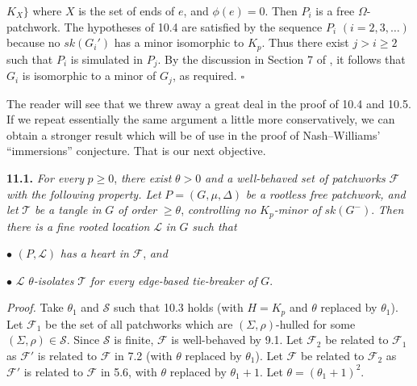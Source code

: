 \noindent $K_X\}$ where $X$ is the set of ends of $e$, and $\phi(e) = 0$. Then $P_i$ is a free $\Omega$-patchwork. The hypotheses of 10.4 are satisfied by the sequence $P_i$ $(i = 2, 3, \dots)$ because no $sk(G_i')$ has a minor isomorphic to $K_p$. Thus there exist $j > i \ge 2$ such that $P_i$ is simulated in $P_j$. By the discussion in Section 7 of \del{[2]}\fix{[1]}, it follows that $G_i$ is isomorphic to a minor of $G_j$, as required. $\square$


The reader will see that we threw away a great deal in the proof of 10.4 and 10.5. If we repeat essentially the same argument a little more conservatively, we can obtain a stronger result which will be of use in the proof of Nash--Williams' ``immersions'' conjecture. That is our next objective.

\textbf{11.1.} \textit{For every} $p \ge 0$, \textit{there exist} $\theta > 0$ \textit{and a well-behaved set of patchworks} $\mathcal{F}$ \textit{with the following property. Let} $P = (G, \mu, \Delta)$ \textit{be a rootless free patchwork, and let} $\mathcal{T}$ \textit{be a tangle in} $G$ \textit{of order} $\ge \theta$, \textit{controlling no} $K_p$\textit{-minor of} $sk(G^-)$. \textit{Then there is a fine rooted location} $\mathcal{L}$ \textit{in} $G$ \textit{such that}

\hspace*{12pt}$\bullet$ $(P, \mathcal{L})$ \textit{has a heart in} $\mathcal{F}$, \textit{and}

\hspace*{12pt}$\bullet$ $\mathcal{L}$ $\theta$\textit{-isolates} $\mathcal{T}$ \textit{for every edge-based tie-breaker of} $G$.

\textit{Proof.} Take $\theta_1$ and $\mathcal{S}$ such that 10.3 holds (with $H = K_p$ and $\theta$ replaced by $\theta_1$). Let $\mathcal{F}_1$ be the set of all patchworks which are $(\Sigma, \rho)$-hulled for some $(\Sigma, \rho) \in \mathcal{S}$. Since $\mathcal{S}$ is finite, $\mathcal{F}$ is well-behaved by 9.1. Let $\mathcal{F}_2$ be related to $\mathcal{F}_1$ as $\mathcal{F}'$ is related to $\mathcal{F}$ in 7.2 (with $\theta$ replaced by $\theta_1$). Let $\mathcal{F}$ be related to $\mathcal{F}_2$ as $\mathcal{F}'$ is related to $\mathcal{F}$ in 5.6, with $\theta$ replaced by $\theta_1 + 1$. Let $\theta = (\theta_1 + 1)^2$.

